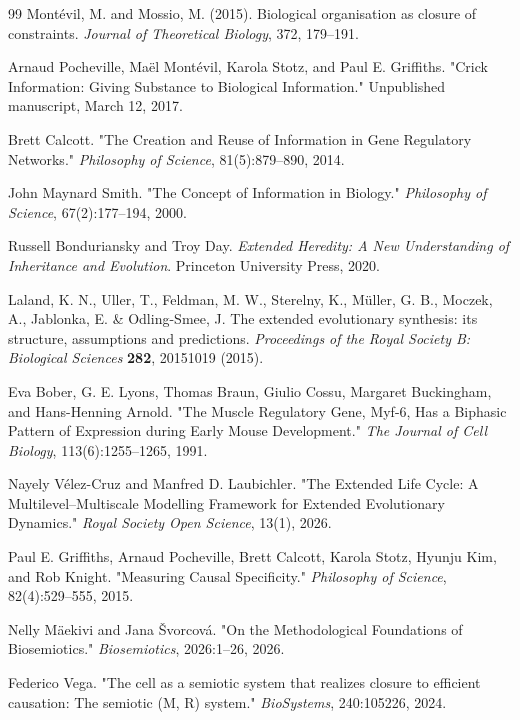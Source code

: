 \documentclass[pdflatex,sn-mathphys-num]{sn-jnl}
\theoremstyle{thmstylethree}
\theoremstyle{thmstyleone}
\begin{document}
\begin{thebibliography}{99}
Mont{\'e}vil, M. and Mossio, M. (2015).
Biological organisation as closure of constraints.
\textit{Journal of Theoretical Biology}, 372, 179--191.

Arnaud Pocheville, Ma\"el Mont\'evil, Karola Stotz, and Paul E. Griffiths.
"Crick Information: Giving Substance to Biological Information."
Unpublished manuscript, March 12, 2017.

Brett Calcott.
"The Creation and Reuse of Information in Gene Regulatory Networks."
\textit{Philosophy of Science}, 81(5):879--890, 2014.

John Maynard Smith.
"The Concept of Information in Biology."
\textit{Philosophy of Science}, 67(2):177--194, 2000.

Russell Bonduriansky and Troy Day.
\textit{Extended Heredity: A New Understanding of Inheritance and Evolution}.
Princeton University Press, 2020.

Laland, K. N., Uller, T., Feldman, M. W., Sterelny, K., M{\"u}ller, G. B., Moczek, A., Jablonka, E. \& Odling-Smee, J. The extended evolutionary synthesis: its structure, assumptions and predictions. \textit{Proceedings of the Royal Society B: Biological Sciences} \textbf{282}, 20151019 (2015).

Eva Bober, G. E. Lyons, Thomas Braun, Giulio Cossu, Margaret Buckingham,
and Hans-Henning Arnold.
"The Muscle Regulatory Gene, Myf-6, Has a Biphasic Pattern of Expression during Early Mouse Development."
\textit{The Journal of Cell Biology}, 113(6):1255--1265, 1991.

Nayely V\'elez-Cruz and Manfred D. Laubichler.
"The Extended Life Cycle: A Multilevel--Multiscale Modelling Framework for Extended Evolutionary Dynamics."
\textit{Royal Society Open Science}, 13(1), 2026.


Paul E. Griffiths, Arnaud Pocheville, Brett Calcott, Karola Stotz,
Hyunju Kim, and Rob Knight.
"Measuring Causal Specificity."
\textit{Philosophy of Science}, 82(4):529--555, 2015.

Nelly M{\"a}ekivi and Jana {\v{S}}vorcov{\'a}.
"On the Methodological Foundations of Biosemiotics."
\textit{Biosemiotics}, 2026:1--26, 2026.

Federico Vega.
"The cell as a semiotic system that realizes closure to efficient causation:
The semiotic (M, R) system."
\textit{BioSystems}, 240:105226, 2024.


\end{thebibliography}
\end{document}
